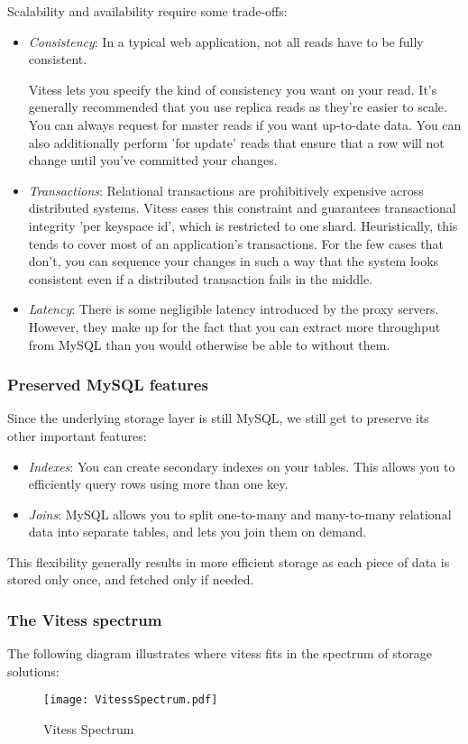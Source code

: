 Scalability and availability require some trade-offs:
\begin{itemize}
\item  \emph{Consistency}: In a typical web application, not all reads have to be
fully consistent.

Vitess lets you specify the kind of consistency you want on your read.
It's generally recommended that you use replica reads as they're easier to scale.
You can always request for master reads if you want up-to-date data.
You can also additionally perform 'for update' reads that ensure that
a row will not change until you've committed your changes.
\item  \emph{Transactions}: Relational transactions are prohibitively expensive
across distributed systems.
Vitess eases this constraint and guarantees transactional integrity
'per keyspace id', which is restricted to one shard.
Heuristically, this tends to cover most of an application's transactions.
For the few cases that don't, you can sequence your changes in such a way
that the system looks consistent even if a distributed transaction fails
in the middle.
\item  \emph{Latency}: There is some negligible latency introduced by the proxy servers.
However, they make up for the fact that you can extract more throughput from
MySQL than you would otherwise be able to without them.
\end{itemize}

\subsubsection{Preserved MySQL features}\hypertarget{preserved-mysql-features}{}\label{preserved-mysql-features}

Since the underlying storage layer is still MySQL, we still get to preserve
its other important features:
\begin{itemize}
\item  \emph{Indexes}: You can create secondary indexes on your tables. This allows you
to efficiently query rows using more than one key.
\item  \emph{Joins}:  MySQL allows you to split one-to-many and many-to-many relational data
into separate tables, and lets you join them on demand.
\end{itemize}
This flexibility generally results in more efficient storage as each piece of
data is stored only once, and fetched only if needed.

\subsubsection{The Vitess spectrum}\hypertarget{the-vitess-spectrum}{}\label{the-vitess-spectrum}

The following diagram illustrates where vitess fits in the spectrum of storage solutions:

\begin{figure}[H]
\caption{Vitess Spectrum}
\label{fig:Vitess Spectrum}
\begin{center}
\texttt{[image: VitessSpectrum.pdf]}
\end{center}
\end{figure}




